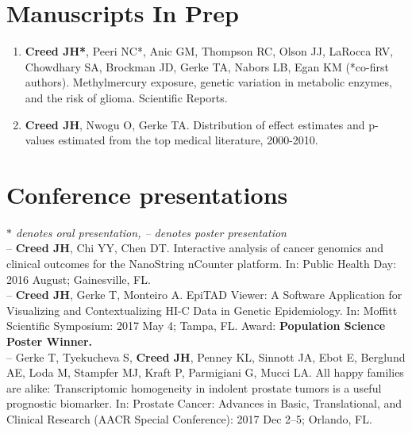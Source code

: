 \documentclass[11pt, a4paper]{article} %
\begin{document}
\section*{Manuscripts In Prep}
\begin{enumerate}[leftmargin=*]

\item{} {\bf Creed JH*}, Peeri NC*, Anic GM, Thompson RC, Olson JJ, LaRocca RV, Chowdhary SA, Brockman JD, Gerke TA, Nabors LB, Egan KM (*co-first authors). Methylmercury exposure, genetic variation in metabolic enzymes, and the risk of glioma. Scientific Reports.

\item{} {\bf Creed JH}, Nwogu O, Gerke TA. Distribution of effect estimates and p-values estimated from the top medical literature, 2000-2010. 


\end{enumerate}

\section*{Conference presentations}
\vspace{-.3cm}
{\footnotesize\emph{$*$ denotes oral presentation, -- denotes poster presentation}}\\

-- {\bf Creed JH}, Chi YY, Chen DT. Interactive analysis of cancer genomics and clinical outcomes for the NanoString nCounter platform. In: Public Health Day: 2016 August; Gainesville, FL.\\

-- {\bf Creed JH}, Gerke T, Monteiro A. EpiTAD Viewer: A Software Application for Visualizing and Contextualizing HI-C Data in Genetic Epidemiology. In: Moffitt Scientific Symposium: 2017 May 4; Tampa, FL. Award: {\bf Population Science Poster Winner.}\\

-- Gerke T, Tyekucheva S, {\bf Creed JH}, Penney KL, Sinnott JA, Ebot E, Berglund AE, Loda M, Stampfer MJ, Kraft P, Parmigiani G, Mucci LA. All happy families are alike: Transcriptomic homogeneity in indolent prostate tumors is a useful prognostic biomarker. In: Prostate Cancer: Advances in Basic, Translational, and Clinical Research (AACR Special Conference): 2017 Dec 2--5; Orlando, FL. \\
\end{document}
